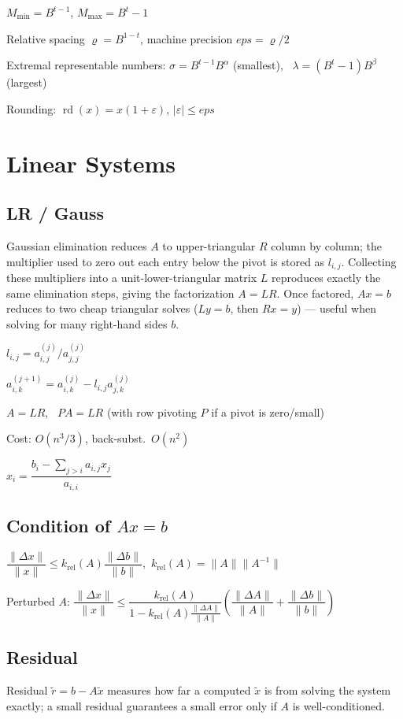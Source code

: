 \documentclass[11pt]{extarticle}
\begin{document}
$M_{\min}=B^{t-1}$, $M_{\max}=B^t-1$

Relative spacing $\varrho=B^{1-t}$, \quad machine precision $eps=\varrho/2$

Extremal representable numbers: $\sigma=B^{t-1}B^\alpha$ (smallest), \ $\lambda=(B^t-1)B^\beta$ (largest)

Rounding: $\operatorname{rd}(x)=x(1+\varepsilon)$, $|\varepsilon|\le eps$

\section{Linear Systems}
\subsection{LR / Gauss}
Gaussian elimination reduces $A$ to upper-triangular $R$ column by column; the multiplier used to zero out each entry below the pivot is stored as $l_{i,j}$. Collecting these multipliers into a unit-lower-triangular matrix $L$ reproduces exactly the same elimination steps, giving the factorization $A=LR$. Once factored, $Ax=b$ reduces to two cheap triangular solves ($Ly=b$, then $Rx=y$) --- useful when solving for many right-hand sides $b$.

$l_{i,j}=a_{i,j}^{(j)}/a_{j,j}^{(j)}$

$a_{i,k}^{(j+1)}=a_{i,k}^{(j)}-l_{i,j}a_{j,k}^{(j)}$

$A=LR$, \ $PA=LR$ (with row pivoting $P$ if a pivot is zero/small)

Cost: $O(n^3/3)$, back-subst.\ $O(n^2)$

$x_i=\dfrac{b_i-\sum_{j>i}a_{i,j}x_j}{a_{i,i}}$

\subsection{Condition of $Ax=b$}
$\dfrac{\|\Delta x\|}{\|x\|}\le k_{\text{rel}}(A)\dfrac{\|\Delta b\|}{\|b\|}$,\ $k_{\text{rel}}(A)=\|A\|\|A^{-1}\|$

Perturbed $A$: $\dfrac{\|\Delta x\|}{\|x\|}\le\dfrac{k_{\text{rel}}(A)}{1-k_{\text{rel}}(A)\frac{\|\Delta A\|}{\|A\|}}\left(\dfrac{\|\Delta A\|}{\|A\|}+\dfrac{\|\Delta b\|}{\|b\|}\right)$

\subsection{Residual}
Residual $\tilde r=b-A\tilde x$ measures how far a computed $\tilde x$ is from solving the system exactly; a small residual guarantees a small error only if $A$ is well-conditioned.
\end{document}
